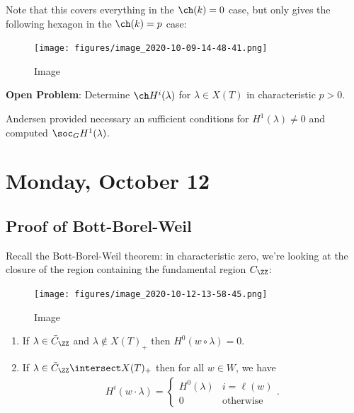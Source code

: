 Note that this covers everything in the \(\ch(k) = 0\) case, but only
gives the following hexagon in the \(\ch(k) = p\) case:

\begin{figure}
\centering
\texttt{[image: figures/image\_2020-10-09-14-48-41.png]}
\caption{Image}
\end{figure}

\begin{remark}

\textbf{Open Problem}: Determine \(\ch H^i(\lambda)\) for
\(\lambda\in X(T)\) in characteristic \(p>0\).

Andersen provided necessary an sufficient conditions for
\(H^1(\lambda) \neq 0\) and computed \(\soc_G H^1(\lambda)\).

\end{remark}

\hypertarget{monday-october-12}{%
\section{Monday, October 12}\label{monday-october-12}}

\hypertarget{proof-of-bott-borel-weil}{%
\subsection{Proof of Bott-Borel-Weil}\label{proof-of-bott-borel-weil}}

Recall the Bott-Borel-Weil theorem: in characteristic zero, we're
looking at the closure of the region containing the fundamental region
\(C_\ZZ\):

\begin{figure}
\centering
\texttt{[image: figures/image\_2020-10-12-13-58-45.png]}
\caption{Image}
\end{figure}

\begin{theorem}

\begin{enumerate}
\def\labelenumi{\alph{enumi}.}
\item
  If \(\lambda \in \bar{C}_\ZZ\) and \(\lambda \not\in X(T)_+\) then
  \(H^0(w\circ \lambda) = 0\).
\item
  If \(\lambda\in \bar{C}_\ZZ \intersect X(T)_+\) then for all
  \(w\in W\), we have
  \begin{align*}  
  H^i(w\cdot \lambda) = 
  \begin{cases}
  H^0(\lambda)& i = \ell(w) \\
  0 & \text{otherwise}
  \end{cases}
  .\end{align*}
\end{enumerate}

\end{theorem}

